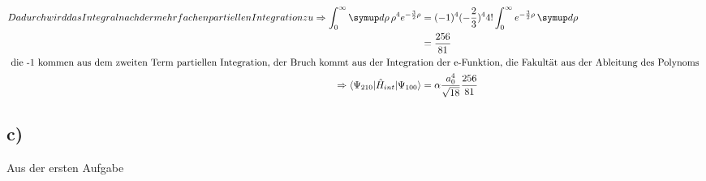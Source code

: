 \begin{align}
{        Dadurch wird das Integral nach der mehrfachen partiellen Integration zu
    }
    \Rightarrow \int_0^{\infty} \dif{\rho} \rho ^4 e^{-\frac{3}{2} \rho} &= (-1)^4 (-\frac{2}{3})^4 4! \int_0^{\infty} e^{-\frac{3}{2}\rho} \dif{\rho}\\
    &=\frac{256}{81}\\
    \intertext{
        die -1 kommen aus dem zweiten Term partiellen Integration, der Bruch kommt aus der
        Integration der e-Funktion, die Fakultät aus der Ableitung des Polynoms
    }
    \Rightarrow \bra{\Psi _{210}}\hat H _{int} \ket{\Psi _{100}}&= \alpha \frac{a_0^4}{\sqrt{18}} \frac{256}{81} \\
\end{align}


\subsection{c)}
Aus der ersten Aufgabe
